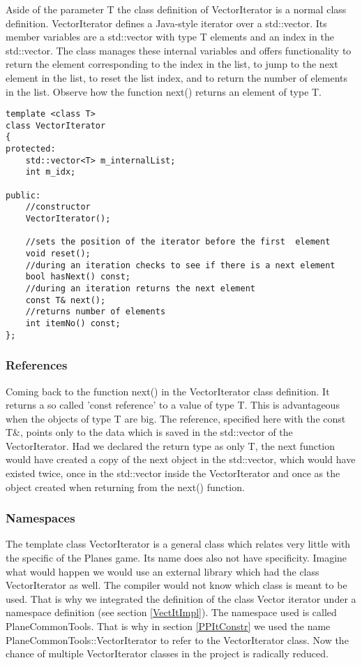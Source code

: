 Aside of the parameter T the class definition of VectorIterator is a normal class definition. VectorIterator defines a Java-style iterator over a std::vector. Its member variables are a std::vector with type T elements and an index in the std::vector. The class manages these internal variables and offers functionality to return the element corresponding to the index in the list, to jump to the next element in the list, to reset the list index, and to return the number of elements in the list. Observe how the function next() returns an element of type T.

\begin{lstlisting}
template <class T>
class VectorIterator
{
protected:
    std::vector<T> m_internalList;
    int m_idx;

public:
    //constructor
    VectorIterator();

    //sets the position of the iterator before the first  element
    void reset();
    //during an iteration checks to see if there is a next element
    bool hasNext() const;
    //during an iteration returns the next element
    const T& next();
    //returns number of elements
    int itemNo() const;
};

\end{lstlisting}

\subsubsection {References}

Coming back to the function next() in the VectorIterator class definition. It returns a so called 'const reference' to a value of type T. This is advantageous when the objects of type T are big. The reference, specified here with the const T\&, points only to the data which is saved in the std::vector of the VectorIterator. Had we declared the return type as only T, the next function would have created a copy of the next object in the std::vector, which would have existed twice, once in the std::vector inside the VectorIterator and once as the object created when returning from the next() function.

\subsubsection {Namespaces}

The template class VectorIterator is a general class which relates very little with the specific of the Planes game. Its name does also not have specificity. Imagine what would happen we would use an external library which had the class VectorIterator as well. The compiler would not know which class is meant to be used. That is why we integrated the definition of the class Vector iterator under a namespace definition (see section \ref{VectItImpl}). The namespace used is called PlaneCommonTools. That is why in section \ref{PPItConstr} we used the name PlaneCommonTools::VectorIterator to refer to the VectorIterator class. Now the chance of multiple VectorIterator classes in the project is radically reduced. 

